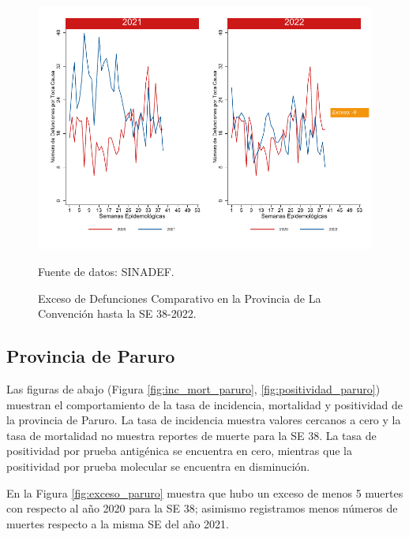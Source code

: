 \documentclass[12pt,a4paper,openany]{book}
\begin{document}
	\begin{figure}[h]
		\caption{Exceso de Defunciones Comparativo en la Provincia de La Convención hasta la SE 38-2022.}\label{fig:exceso_laconv}
		\begin{center}
			\includegraphics[width=0.7\linewidth]{../figuras/exceso_9.pdf}
		\end{center}
		{\footnotesize {Fuente de datos: SINADEF.}}
	\end{figure}
	
	\clearpage
	
	\subsection*{Provincia de Paruro}
	\noindent Las figuras de abajo (Figura \ref{fig:inc_mort_paruro}, \ref{fig:positividad_paruro}) muestran el comportamiento de la tasa de incidencia, mortalidad y positividad de la provincia de Paruro. La tasa de incidencia muestra valores cercanos a cero y la tasa de mortalidad no muestra reportes de muerte para la SE 38. La tasa de positividad por prueba antigénica se encuentra en cero, mientras que la positividad por prueba molecular se encuentra en disminución.
	
	En la Figura \ref{fig:exceso_paruro} muestra que hubo un exceso de menos 5 muertes con respecto al año 2020 para la SE 38; asimismo registramos menos números de muertes respecto a la misma SE del año 2021.
	
\end{document}
